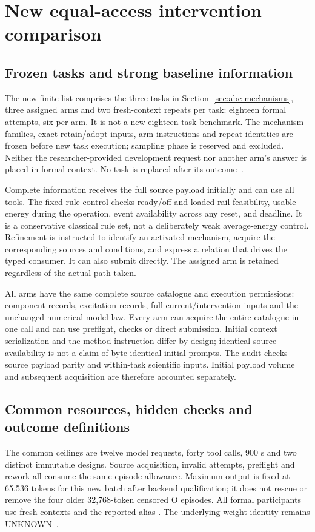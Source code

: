 \section{New equal-access intervention comparison}
\label{sec:abc-protocol}
\subsection{Frozen tasks and strong baseline information}
The new finite list comprises the three tasks in
Section~\ref{sec:abc-mechanisms}, three assigned arms and two fresh-context
repeats per task: eighteen formal attempts, six per arm. It is not a new
eighteen-task benchmark. The mechanism families, exact retain/adopt inputs,
arm instructions and repeat identities are frozen before new task execution;
sampling phase is reserved and excluded. Neither the researcher-provided
development request nor another arm's answer is placed in formal context.
No task is replaced after its outcome~\cite{abcb,abcaudit}.

Complete information receives the full source payload initially and can use
all tools. The fixed-rule control checks ready/off and loaded-rail feasibility,
usable energy during the operation, event availability across any reset, and
deadline. It is a conservative classical rule set, not a deliberately weak
average-energy control. Refinement is instructed to identify an activated
mechanism, acquire the corresponding sources and conditions, and express a
relation that drives the typed consumer. It can also submit directly. The
assigned arm is retained regardless of the actual path taken.

All arms have the same complete source catalogue and execution permissions:
component records, excitation records, full current/intervention inputs and
the unchanged numerical model law. Every arm can acquire the entire catalogue
in one call and can use preflight, checks or direct submission. Initial context
serialization and the method instruction differ by design; identical source
availability is not a claim of byte-identical initial prompts. The audit checks
source payload parity and within-task scientific inputs. Initial payload volume
and subsequent acquisition are therefore accounted separately.

\subsection{Common resources, hidden checks and outcome definitions}
The common ceilings are twelve model requests, forty tool calls, 900 s and two
distinct immutable designs. Source acquisition, invalid attempts, preflight and
rework all consume the same episode allowance. Maximum output is fixed at
65,536 tokens for this new batch after backend qualification; it does not
rescue or remove the four older 32,768-token censored O episodes. All formal
participants use fresh contexts and the reported alias .
The underlying weight identity remains UNKNOWN~\cite{abcaudit}.

